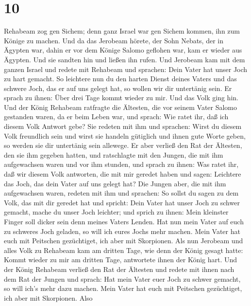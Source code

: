 \hypertarget{section-9}{%
\section{10}\label{section-9}}

 Rehabeam zog gen Sichem; denn ganz Israel war gen Sichem
kommen, ihn zum Könige zu machen.  Und da das Jerobeam
hörete, der Sohn Nebats, der in Ägypten war, dahin er vor dem Könige
Salomo geflohen war, kam er wieder aus Ägypten.  Und sie
sandten hin und ließen ihn rufen. Und Jerobeam kam mit dem ganzen Israel
und redete mit Rehabeam und sprachen:  Dein Vater hat unser
Joch zu hart gemacht. So leichtere nun du den harten Dienst deines
Vaters und das schwere Joch, das er auf uns gelegt hat, so wollen wir
dir untertänig sein.  Er sprach zu ihnen: Über drei Tage
kommt wieder zu mir. Und das Volk ging hin.  Und der König
Rehabeam ratfragte die Ältesten, die vor seinem Vater Salomo gestanden
waren, da er beim Leben war, und sprach: Wie ratet ihr, daß ich diesem
Volk Antwort gebe?  Sie redeten mit ihm und sprachen: Wirst
du diesem Volk freundlich sein und wirst sie handeln gütiglich und ihnen
gute Worte geben, so werden sie dir untertänig sein allewege.
 Er aber verließ den Rat der Ältesten, den sie ihm gegeben
hatten, und ratschlagte mit den Jungen, die mit ihm aufgewachsen waren
und vor ihm stunden,  und sprach zu ihnen: Was ratet ihr,
daß wir diesem Volk antworten, die mit mir geredet haben und sagen:
Leichtere das Joch, das dein Vater auf uns gelegt hat?  Die
Jungen aber, die mit ihm aufgewachsen waren, redeten mit ihm und
sprachen: So sollst du sagen zu dem Volk, das mit dir geredet hat und
spricht: Dein Vater hat unser Joch zu schwer gemacht, mache du unser
Joch leichter; und sprich zu ihnen: Mein kleinster Finger soll dicker
sein denn meines Vaters Lenden.  Hat nun mein Vater auf
euch zu schweres Joch geladen, so will ich eures Jochs mehr machen. Mein
Vater hat euch mit Peitschen gezüchtiget, ich aber mit Skorpionen.
 Als nun Jerobeam und alles Volk zu Rehabeam kam am dritten
Tage, wie denn der König gesagt hatte: Kommt wieder zu mir am dritten
Tage,  antwortete ihnen der König hart. Und der König
Rehabeam verließ den Rat der Ältesten  und redete mit ihnen
nach dem Rat der Jungen und sprach: Hat mein Vater euer Joch zu schwer
gemacht, so will ich's mehr dazu machen. Mein Vater hat euch mit
Peitschen gezüchtiget, ich aber mit Skorpionen.  Also
